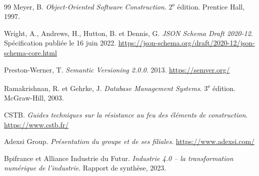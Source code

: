 \begin{thebibliography}{99}
Meyer, B. \textit{Object-Oriented Software Construction}. 2\textsuperscript{e} édition. Prentice Hall, 1997.

Wright, A., Andrews, H., Hutton, B. et Dennis, G. \textit{JSON Schema Draft 2020-12}. Spécification publiée le 16 juin 2022. \url{https://json-schema.org/draft/2020-12/json-schema-core.html}

Preston-Werner, T. \textit{Semantic Versioning 2.0.0}. 2013. \url{https://semver.org/}

Ramakrishnan, R. et Gehrke, J. \textit{Database Management Systems}. 3\textsuperscript{e} édition. McGraw-Hill, 2003.

CSTB. \textit{Guides techniques sur la résistance au feu des éléments de construction}. \url{https://www.cstb.fr/}

Adexsi Group. \textit{Présentation du groupe et de ses filiales}. \url{https://www.adexsi.com/}

Bpifrance et Alliance Industrie du Futur. \textit{Industrie 4.0 -- la transformation numérique de l'industrie}. Rapport de synthèse, 2023.

\end{thebibliography}
